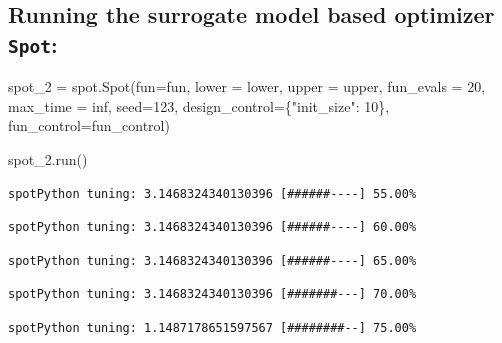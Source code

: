 \documentclass[
  letterpaper,
  DIV=11,
  numbers=noendperiod]{scrreprt}
\newenvironment{Shaded}{\begin{snugshade}}{\end{snugshade}}
\newcommand{\DecValTok}[1]{\textcolor[rgb]{0.68,0.00,0.00}{#1}}
\newcommand{\NormalTok}[1]{\textcolor[rgb]{0.00,0.23,0.31}{#1}}
\newcommand{\OperatorTok}[1]{\textcolor[rgb]{0.37,0.37,0.37}{#1}}
\newcommand{\StringTok}[1]{\textcolor[rgb]{0.13,0.47,0.30}{#1}}
\begin{document}
\hypertarget{running-the-surrogate-model-based-optimizer-spot}{%
\subsection{\texorpdfstring{Running the surrogate model based optimizer
\texttt{Spot}:}{Running the surrogate model based optimizer Spot:}}\label{running-the-surrogate-model-based-optimizer-spot}}

\begin{Shaded}
\begin{Highlighting}[]
\NormalTok{spot\_2 }\OperatorTok{=}\NormalTok{ spot.Spot(fun}\OperatorTok{=}\NormalTok{fun,}
\NormalTok{                   lower }\OperatorTok{=}\NormalTok{ lower,}
\NormalTok{                   upper }\OperatorTok{=}\NormalTok{ upper,}
\NormalTok{                   fun\_evals }\OperatorTok{=} \DecValTok{20}\NormalTok{,}
\NormalTok{                   max\_time }\OperatorTok{=}\NormalTok{ inf,}
\NormalTok{                   seed}\OperatorTok{=}\DecValTok{123}\NormalTok{,}
\NormalTok{                   design\_control}\OperatorTok{=}\NormalTok{\{}\StringTok{"init\_size"}\NormalTok{: }\DecValTok{10}\NormalTok{\},}
\NormalTok{                   fun\_control}\OperatorTok{=}\NormalTok{fun\_control)}
\end{Highlighting}
\end{Shaded}

\begin{Shaded}
\begin{Highlighting}[]
\NormalTok{spot\_2.run()}
\end{Highlighting}
\end{Shaded}

\begin{verbatim}
spotPython tuning: 3.1468324340130396 [######----] 55.00% 
\end{verbatim}

\begin{verbatim}
spotPython tuning: 3.1468324340130396 [######----] 60.00% 
\end{verbatim}

\begin{verbatim}
spotPython tuning: 3.1468324340130396 [######----] 65.00% 
\end{verbatim}

\begin{verbatim}
spotPython tuning: 3.1468324340130396 [#######---] 70.00% 
\end{verbatim}

\begin{verbatim}
spotPython tuning: 1.1487178651597567 [########--] 75.00% 
\end{verbatim}
\end{document}
